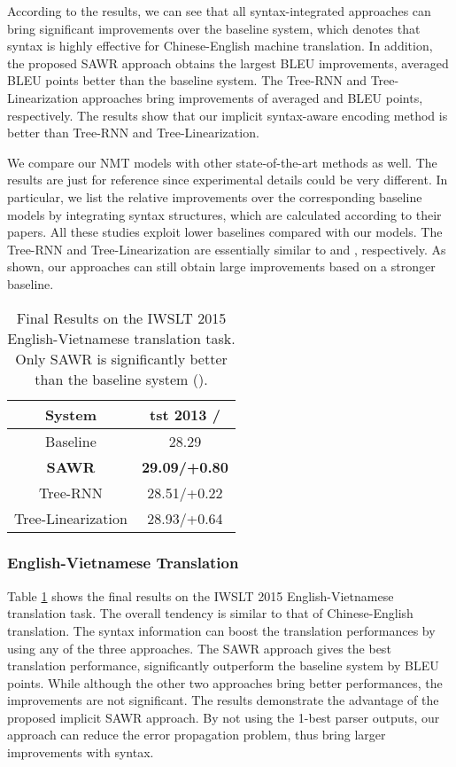 \documentclass[11pt,a4paper]{article}
\begin{document}
\begin{CJK}{UTF8}{gbsn}
According to the results, we can see that all syntax-integrated approaches can bring significant improvements over the baseline system,
which denotes that syntax is highly effective for Chinese-English machine translation.
In addition, the proposed SAWR approach obtains the largest BLEU improvements,
averaged  BLEU points better than the baseline system.
The Tree-RNN and Tree-Linearization approaches bring improvements of averaged   and
 BLEU points, respectively.
The results show that our implicit syntax-aware encoding method is better than Tree-RNN and Tree-Linearization.




We compare our NMT models with other state-of-the-art methods as well.
The results are just for reference since experimental details could be very different.
In particular, we list the relative improvements over the corresponding baseline models by integrating syntax structures, which are calculated according to their papers.
All these studies exploit lower baselines compared with our models.
The Tree-RNN and Tree-Linearization are essentially similar to  and  , respectively.
As shown, our approaches can still obtain large improvements based on a stronger baseline.

\setlength{\tabcolsep}{6.0pt}
\begin{table}[t]
\begin{center}
\begin{tabular}{c|c}
	\hline
	System & tst 2013 /   \\ \hline
	Baseline &   28.29  \\ \hline
    \textbf{SAWR} &    \bf 29.09/+0.80       \\
	Tree-RNN &   28.51/+0.22   \\
    Tree-Linearization &  28.93/+0.64      \\
    \hline
\end{tabular}
\caption{Final Results on the IWSLT 2015 English-Vietnamese translation task. Only SAWR is significantly better than the baseline system (). }
\label{table:germany:result}
\end{center}
\end{table}



\subsubsection{English-Vietnamese Translation}
Table \ref{table:germany:result} shows the final results on the IWSLT 2015 English-Vietnamese translation task.
The overall tendency is similar to that of Chinese-English translation.
The syntax information can boost the translation performances by using any of the three approaches.
The SAWR approach gives the best translation performance,
significantly outperform the baseline system by  BLEU points.
While although the other two approaches bring better performances,
the improvements are not significant.
The results demonstrate the advantage of the proposed implicit SAWR approach.
By not using the 1-best parser outputs,
our approach can reduce the error propagation problem, thus bring larger improvements with syntax.



\end{CJK}
\end{document}
